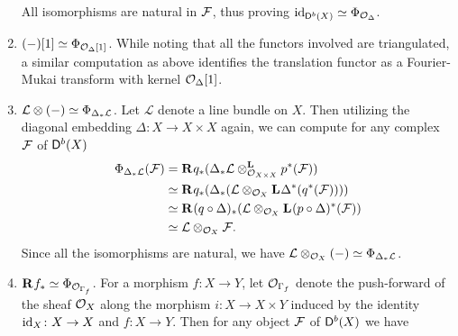 \begin{example}
\begin{enumerate}[label = (\roman*)]
{    %
    All isomorphisms are natural in $\F$, thus proving $\id{\derb{X}} \iso \fm{\struct{\Delta}}$.
    }
    \item{$(-)[1] \iso \fm{\struct{\Delta}[1]}$. While noting that all the functors involved are triangulated, a similar computation as above identifies the translation functor as a Fourier-Mukai transform with kernel $\struct{\Delta}[1]$.}
    \item{
    $\mathcal L \otimes (-) \iso \fm{\Delta_*\mathcal L}$. Let $\mathcal L$ denote a line bundle on $X$. Then utilizing the diagonal embedding $\Delta \colon X \to X \times X$ again, we can compute for any complex $\F$ of $\derb{X}$
    \begin{align*}
        \fm{{\Delta_*\mathcal L}}(\F) &= \rderived{}{q_*}(\derivedtensor{\Delta_*\mathcal L}{p^*(\F)}{\struct{X \times X}}) \\
        &\iso \rderived{}{q_*}(\Delta_*(\mathcal L \otimes_{\struct{X}}\lderived{}{\Delta^*}({q^*}(\F)))) \\
        &\iso \rderived{}{(q \circ \Delta)_*}(\mathcal L \otimes_{\struct{X}} \lderived{}{(p \circ \Delta)^*}(\F)) \\
        &\iso \mathcal L \otimes_{\struct{X}} \F.
    \end{align*}
    Since all the isomorphisms are natural, we have $\mathcal L \otimes_{\struct{X}} (-) \iso \fm{\Delta_*\mathcal L}$.
    } \label{Tensoring by a line bundle is FM}
    \item{$\rderived{}{f_*} \iso \fm{\struct{\Gamma_f}}$. For a morphism $f \colon X \to Y$, let $\struct{\Gamma_f}$ denote the push-forward of the sheaf $\struct{X}$ along the morphism $i\colon X \to X \times Y$ induced by the identity $\id{X}\colon X \to X$ and $f\colon X \to Y$.  Then for any object $\F$ of $\derb{X}$ we have
}
\end{enumerate}
\end{example}
